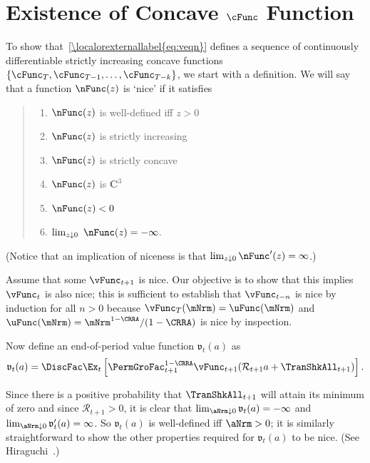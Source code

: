 \documentclass[\econtexRoot/BufferStockTheory]{subfiles}
\begin{document}
\section{Existence of Concave \texorpdfstring{$\cFunc$}{c} Function}\label{sec:ApndxConcaveCFunc}

To show that~\eqref{\localorexternallabel{eq:veqn}} defines a sequence of continuously differentiable strictly increasing concave functions $\{\cFunc_{T},\cFunc_{T-1},\ldots,\cFunc_{T-k}\}$, we start with a definition.  We will say that a function $\nFunc(z)$ is `nice' if it satisfies
\begin{quote}
  \begin{enumerate}\setlength{\itemsep}{0.0ex}
  \item $\nFunc(z)$ is well-defined iff $z>0$

  \item $\nFunc(z)$ is strictly increasing

  \item $\nFunc(z)$ is strictly concave

  \item $\nFunc(z)$ is $ \mathbf{C}^{3}$

  \item $\nFunc(z)<0$

  \item $\lim_{z\downarrow 0}~\nFunc(z) =-\infty $.

  \end{enumerate}
\end{quote}


(Notice that an implication of niceness is that $\lim_{z \downarrow 0} \nFunc^{\prime}(z) = \infty$.)

Assume that some $\vFunc_{t+1}$ is nice.  Our objective is to show that this
implies $\vFunc_{t}$ is also nice; this is sufficient to establish that
$\vFunc_{t-n}$ is nice by induction for all $n > 0$ because $\vFunc_{T}(\mNrm)
=\uFunc(\mNrm) $ and $\uFunc(\mNrm)=\mNrm^{1-\CRRA}/(1-\CRRA)$ is nice by inspection.

\hypertarget{BoroCnstNat}{}
Now define an end-of-period value function $\mathfrak{v}_{t}(a) $ as
\begin{equation}
  \mathfrak{v}_{t}(a) =\DiscFac \Ex_{t}\left[{\PermGroFac}_{t+1}^{1-\CRRA}\vFunc_{t+1}( {\mathcal{R}}_{t+1} a+{\TranShkAll}_{t+1}) \right]. \label{eq:vEnd}
\end{equation}

Since there is a positive probability that $\TranShkAll_{t+1}$ will
attain its minimum of zero and since $\mathcal{R}_{t+1}>0$, it
is clear that $\lim_{\aNrm \downarrow 0} \mathfrak{v}_{t}(a) = -\infty$
and $\lim_{\aNrm \downarrow 0} \mathfrak{v}^{\prime}_{t}(a) = \infty$.  So
$\mathfrak{v}_{t}(a) $ is well-defined iff $\aNrm>0$; it is similarly
straightforward to show the other properties required for $\mathfrak{v}_{t}(a) $ to
be nice.  (See Hiraguchi~\citeyearpar{hiraguchiBSProofs}.)
\end{document}
